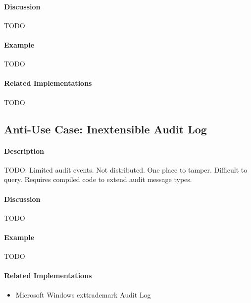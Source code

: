 \paragraph{Discussion}

{\Large TODO}

\paragraph{Example}

{\Large TODO}

\paragraph{Related Implementations}

{\Large TODO}

\subsection{Anti-Use Case: Inextensible Audit Log}

\paragraph{Description}

{\Large TODO:} Limited audit events. Not distributed. One place to tamper. Difficult to query. Requires compiled code to extend audit message types.

\paragraph{Discussion}

{\Large TODO}

\paragraph{Example}

{\Large TODO}

\paragraph{Related Implementations}

\begin{itemize}
        \item Microsoft Windows        exttrademark Audit Log
\end{itemize}
